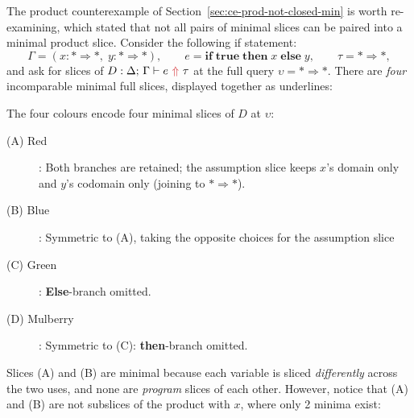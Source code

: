 The product counterexample of Section~\ref{sec:ce-prod-not-closed-min} is worth re-examining, which stated that not all pairs of minimal slices can be paired into a minimal product slice. Consider the following if statement:
\[ \Gamma = (x \mathbin{:} \mathbf{*} \Rightarrow \mathbf{*},\; y \mathbin{:} \mathbf{*} \Rightarrow \mathbf{*}), \qquad e = \mathbf{if}\;\mathbf{true}\;\mathbf{then}\;x\;\mathbf{else}\;y, \qquad \tau = \mathbf{*} \Rightarrow \mathbf{*}, \]
and ask for slices of $D : \synthesis{e}{\tau}$ at the full query $\upsilon = \mathbf{*} \Rightarrow \mathbf{*}$. There are \textit{four} incomparable minimal full slices, displayed together as underlines:

\begin{center}
\end{center}

The four colours encode four minimal slices of $D$ at $\upsilon$:
\begin{description}
\item[(A) {\color{BrickRed}Red}]: Both branches are retained; the assumption slice keeps $x$'s domain only and $y$'s codomain only (joining to $* \Rightarrow *$).
\item[(B) {\color{NavyBlue}Blue}]: Symmetric to (A), taking the opposite choices for the assumption slice
\item[(C) {\color{OliveGreen}Green}]: \textbf{Else}-branch omitted.
\item[(D) {\color{Mulberry}Mulberry}]: Symmetric to (C): \textbf{then}-branch omitted.
\end{description}

Slices (A) and (B) are minimal because each variable is sliced \textit{differently} across the two uses, and none are \textit{program} slices of each other. However, notice that (A) and (B) are not subslices of the product with $x$, where only 2 minima exist:

\begin{center}
\end{center}

